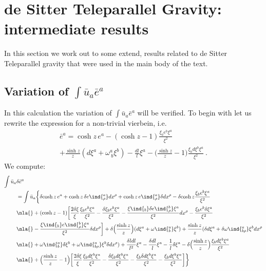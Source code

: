 \documentclass[11pt]{article}
\begin{document}
\newpage
\appendix
\section{de Sitter Teleparallel Gravity: intermediate results}

In this section we work out to some extend, results related to de 
Sitter Teleparallel gravity that were used in the main body of 
the text.

\subsection{Variation of $\int \bar{u}_a \bar{e}^a$}
\label{ssec:dSTG_var_ue}

In this calculation the variation of $\int \bar{u}_a \bar{e}^a$ 
will be verified.  To begin with let us rewrite the expression 
for a non-trivial vierbein, i.e.
\begin{multline*}
	\bar{e}^a = \cosh z\, e^a - (\cosh z -1) \frac{\xi_b e^b 
		\xi^a}{\xi^2} \\
		+ \frac{\sinh z}{z}(d\xi^a + \omega^a_{~b}\xi^b) - 
		\frac{dl}{l} \xi^a - \bigg( \frac{\sinh z}{z} - 1 \bigg) 
		\frac{\xi_b d\xi^b \xi^a}{\xi^2}~.
\end{multline*}
We compute:
\begin{displaymath}
\begin{split}
	\int \bar{u}_a &\delta\bar{e}^a \\
	&= \int \bar{u}_a \bigg\{ \delta\!\cosh z\, e^a + \cosh z\, 
	\delta e\ind{^a_\rho} dx^\rho + \cosh z\, e\ind{^a_\rho} 
	\delta dx^\rho - \delta\!\cosh z \frac{\xi_b e^b \xi^a}{\xi^2} 
	\\
	&\nla{} + (\cosh z - 1) \bigg[ \frac{2\delta\xi}{\xi} 
	\frac{\xi_b e^b \xi^a}{\xi^2} - \frac{\delta\xi_b e^b 
		\xi^a}{\xi^2} -\frac{\xi\ind{_b} \delta e\ind{^b_\rho} 
		\xi^a}{\xi^2} dx^\rho - \frac{\xi_b e^b \delta\xi^a}{\xi^2} 
	\\
	&\nla{} - \frac{\xi\ind{_b} e\ind{^b_\rho} \xi^a}{\xi^2} 
	\delta dx^\rho \bigg] + \delta \Big( \frac{\sinh z}{z} \Big) ( 
	d\xi^a + \omega\ind{^a_b}\xi^b )
	+ \frac{\sinh z}{z} (\delta d\xi^a + \delta 
	\omega\ind{^a_{b\rho}} \xi^b dx^\rho
	\\
	&\nla{} + \omega\ind{^a_b} \delta\xi^b + 
	\omega\ind{^a_{b\rho}} \xi^b \delta dx^\rho) + \frac{\delta l 
		dl}{l^2} \xi^a - \frac{\delta dl}{l} \xi^a - 
	\frac{1}{l}\delta\xi^a - \delta \Big( \frac{\sinh z}{z} \Big) 
	\frac{\xi_b d\xi^b \xi^a}{\xi^2}
	\\
	&\nla{} + \Big( \frac{\sinh z}{z} -1 \Big) \bigg[ 
	\frac{2\delta\xi}{\xi} \frac{\xi_b d\xi^b \xi^a}{\xi^2} - 
	\frac{\delta\xi_b d\xi^b \xi^a}{\xi^2} - \frac{\xi_b \delta 
		d\xi^b \xi^a}{\xi^2} - \frac{\xi_b d\xi^b \xi^a}{\xi^2} 
	\bigg]\bigg\}
\end{split}
\end{displaymath}
\end{document}
